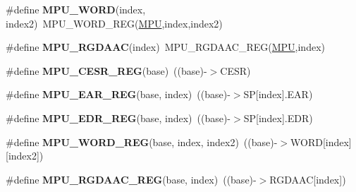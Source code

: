 \begin{DoxyCompactItemize}
\item 
\#define {\bfseries M\+P\+U\+\_\+\+W\+O\+RD}(index,  index2)~M\+P\+U\+\_\+\+W\+O\+R\+D\+\_\+\+R\+EG(\hyperlink{group__MPU__Peripheral__Access__Layer_gaad8182e72fe5037a6ba1eb65a1554e0b}{M\+PU},index,index2)\hypertarget{group__MPU__Register__Accessor__Macros_ga1a684110cf0cb13beef3a798d88b398e}{}\label{group__MPU__Register__Accessor__Macros_ga1a684110cf0cb13beef3a798d88b398e}

\item 
\#define {\bfseries M\+P\+U\+\_\+\+R\+G\+D\+A\+AC}(index)~M\+P\+U\+\_\+\+R\+G\+D\+A\+A\+C\+\_\+\+R\+EG(\hyperlink{group__MPU__Peripheral__Access__Layer_gaad8182e72fe5037a6ba1eb65a1554e0b}{M\+PU},index)\hypertarget{group__MPU__Register__Accessor__Macros_ga52abc4cdca12582480bbf9c815ec9883}{}\label{group__MPU__Register__Accessor__Macros_ga52abc4cdca12582480bbf9c815ec9883}

\item 
\#define {\bfseries M\+P\+U\+\_\+\+C\+E\+S\+R\+\_\+\+R\+EG}(base)~((base)-\/$>$C\+E\+SR)\hypertarget{group__MPU__Register__Accessor__Macros_ga90cec6606b837eae6053c8079f301371}{}\label{group__MPU__Register__Accessor__Macros_ga90cec6606b837eae6053c8079f301371}

\item 
\#define {\bfseries M\+P\+U\+\_\+\+E\+A\+R\+\_\+\+R\+EG}(base,  index)~((base)-\/$>$SP\mbox{[}index\mbox{]}.E\+AR)\hypertarget{group__MPU__Register__Accessor__Macros_ga4e7ea42772044db4055c2d6352cbdfcd}{}\label{group__MPU__Register__Accessor__Macros_ga4e7ea42772044db4055c2d6352cbdfcd}

\item 
\#define {\bfseries M\+P\+U\+\_\+\+E\+D\+R\+\_\+\+R\+EG}(base,  index)~((base)-\/$>$SP\mbox{[}index\mbox{]}.E\+DR)\hypertarget{group__MPU__Register__Accessor__Macros_ga65449f7488a8b69617758276f4dfdd1f}{}\label{group__MPU__Register__Accessor__Macros_ga65449f7488a8b69617758276f4dfdd1f}

\item 
\#define {\bfseries M\+P\+U\+\_\+\+W\+O\+R\+D\+\_\+\+R\+EG}(base,  index,  index2)~((base)-\/$>$W\+O\+RD\mbox{[}index\mbox{]}\mbox{[}index2\mbox{]})\hypertarget{group__MPU__Register__Accessor__Macros_ga841d3d7b915f9249607308b910b5e292}{}\label{group__MPU__Register__Accessor__Macros_ga841d3d7b915f9249607308b910b5e292}

\item 
\#define {\bfseries M\+P\+U\+\_\+\+R\+G\+D\+A\+A\+C\+\_\+\+R\+EG}(base,  index)~((base)-\/$>$R\+G\+D\+A\+AC\mbox{[}index\mbox{]})\hypertarget{group__MPU__Register__Accessor__Macros_ga1aab06cc90139a4e8e69ef29d984f1c9}{}\label{group__MPU__Register__Accessor__Macros_ga1aab06cc90139a4e8e69ef29d984f1c9}


\end{DoxyCompactItemize}
